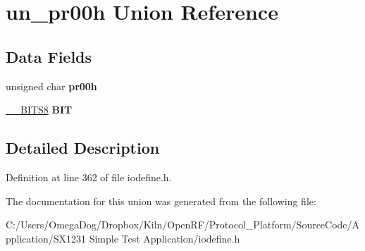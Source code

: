 \hypertarget{unionun__pr00h}{\section{un\-\_\-pr00h Union Reference}
\label{unionun__pr00h}
}
\subsection*{Data Fields}
\begin{DoxyCompactItemize}
\item 
\hypertarget{unionun__pr00h_ab0fca44fc44cd111d400a4d501889205}{unsigned char {\bfseries pr00h}}\label{unionun__pr00h_ab0fca44fc44cd111d400a4d501889205}

\item 
\hypertarget{unionun__pr00h_af3dda01c88ed503a9d7aabee74e739ad}{\hyperlink{struct_____b_i_t_s8}{\-\_\-\-\_\-\-B\-I\-T\-S8} {\bfseries B\-I\-T}}\label{unionun__pr00h_af3dda01c88ed503a9d7aabee74e739ad}

\end{DoxyCompactItemize}


\subsection{Detailed Description}


Definition at line 362 of file iodefine.\-h.



The documentation for this union was generated from the following file\-:\begin{DoxyCompactItemize}
\item 
C\-:/\-Users/\-Omega\-Dog/\-Dropbox/\-Kiln/\-Open\-R\-F/\-Protocol\-\_\-\-Platform/\-Source\-Code/\-Application/\-S\-X1231 Simple Test Application/iodefine.\-h\end{DoxyCompactItemize}
